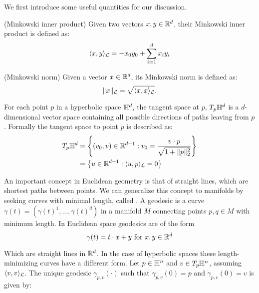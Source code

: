 

We first introduce some useful quantities for our discussion.

\begin{definition}(Minkowski inner product) \label{def:minkowskiInnerProduct}
    Given two vectors $x,y \in \mathbb{R}^d$, their Minkowski inner product is defined as:
    \begin{equation*}
        \langle x, y \rangle_{\mathcal{L}} = -x_0y_0+\sum_{i=1}^d x_iy_i
    \end{equation*}    
\end{definition}

\begin{definition}(Minkowski norm) \label{def:minkowskiNorm}
    Given a vector $x \in \mathbb{R}^d$, its Minkowski norm is defined as:
    \begin{equation*}
        \|x\|_{\mathcal{L}} = \sqrt{\langle x, x \rangle_{\mathcal{L}}}.
    \end{equation*}
\end{definition}

For each point $p$ in a hyperbolic space $\mathbb{H}^d$, the tangent space at $p$, $T_p\mathbb{H}^d$ is a $d$-dimensional vector space containing all possible directions of paths leaving from $p$. Formally the tangent space to point $p$ is described as:
\begin{align*}
    T_p\mathbb{H}^d &= \left\{(v_0,v) \in \mathbb{R}^{d+1} : v_0 = \frac{v \cdot p}{\sqrt{1 + \|p\|^2_2}}\right\}\\
        &= \left\{u\in \mathbb{R}^{d+1} : \langle u, p \rangle_{\mathcal{L}} = 0\right\}
\end{align*}

An important concept in Euclidean geometry is that of straight lines, which are shortest paths between points. We can generalize this concept to manifolds by seeking curves with minimal length, called . A geodesic is a curve $\gamma(t)=(\gamma(t)^1, \dots, \gamma(t)^d)$ in a manifold $M$ connecting points $p,q\in M$ with minimum length. In Euclidean space geodesics are of the form 
\begin{equation}
    \gamma(t) = t\cdot x + y \text{ for } x,y\in \mathbb{R}^d
\end{equation}

Which are straight lines in $\mathbb{R}^d$. In the case of hyperbolic spaces these length-minimizing curves have a different form. Let $p\in\mathbb{H}^n$ and $v\in T_p\mathbb{H}^n$, assuming $\langle v,v\rangle_{\mathcal{L}} $. The unique geodesic $\gamma_{p,v}(\cdot)$ such that $\gamma_{p,v}(0)=p$ and $\dot{\gamma}_{p,v}(0)=v$ is given by:

